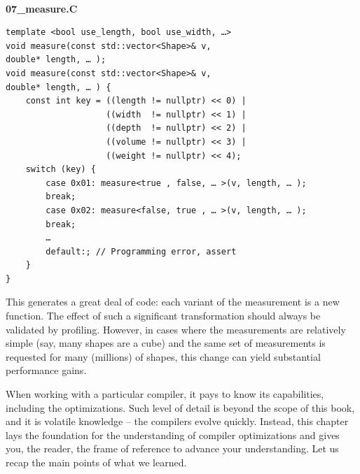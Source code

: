 \hspace*{\fill} \\ %
\noindent
\textbf{07\_measure.C}
\begin{lstlisting}[style=styleCXX]
template <bool use_length, bool use_width, …>
void measure(const std::vector<Shape>& v,
double* length, … );
void measure(const std::vector<Shape>& v,
double* length, … ) {
	const int key = ((length != nullptr) << 0) |
					((width  != nullptr) << 1) |
				    ((depth  != nullptr) << 2) |
				    ((volume != nullptr) << 3) |
				    ((weight != nullptr) << 4);
	switch (key) {
		case 0x01: measure<true , false, … >(v, length, … );
		break;
		case 0x02: measure<false, true , … >(v, length, … );
		break;
		…
		default:; // Programming error, assert
	}
}
\end{lstlisting}

This generates a great deal of code: each variant of the measurement is a new function. The effect of such a significant transformation should always be validated by profiling. However, in cases where the measurements are relatively simple (say, many shapes are a cube) and the same set of measurements is requested for many (millions) of shapes, this change can yield substantial performance gains. 

When working with a particular compiler, it pays to know its capabilities, including the optimizations. Such level of detail is beyond the scope of this book, and it is volatile knowledge – the compilers evolve quickly. Instead, this chapter lays the foundation for the understanding of compiler optimizations and gives you, the reader, the frame of reference to advance your understanding. Let us recap the main points of what we learned.


